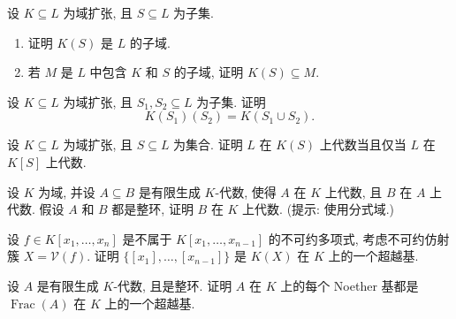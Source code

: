 \BookExerciseHeading
\begin{BookExercises}
  \item\label{ex:generated-field-minimality} 设 $K\subseteq L$ 为域扩张, 且 $S\subseteq L$ 为子集.
  \begin{enumerate}
    \item 证明 $K(S)$ 是 $L$ 的子域.
    \item 若 $M$ 是 $L$ 中包含 $K$ 和 $S$ 的子域, 证明 $K(S)\subseteq M$.
  \end{enumerate}
  \item\label{ex:generated-field-in-stages} 设 $K\subseteq L$ 为域扩张, 且 $S_{1},S_{2}\subseteq L$ 为子集. 证明
  \[
    K(S_{1})(S_{2})=K(S_{1}\cup S_{2}).
  \]
  \item\label{ex:algebraic-over-generated-field-iff-algebraic-over-algebra} 设 $K\subseteq L$ 为域扩张, 且 $S\subseteq L$ 为集合. 证明 $L$ 在 $K(S)$ 上代数当且仅当 $L$ 在 $K[S]$ 上代数.
  \item\label{ex:algebraic-transitivity-for-domains} 设 $K$ 为域, 并设 $A\subseteq B$ 是有限生成 $K$-代数, 使得 $A$ 在 $K$ 上代数, 且 $B$ 在 $A$ 上代数. 假设 $A$ 和 $B$ 都是整环, 证明 $B$ 在 $K$ 上代数. (提示: 使用分式域.)
  \item\label{ex:hypersurface-transcendence-basis} 设 $f\in K[x_{1},\ldots,x_{n}]$ 是不属于 $K[x_{1},\ldots,x_{n-1}]$ 的不可约多项式, 考虑不可约仿射簇 $X=\mathcal{V}(f)$. 证明 $\{[x_{1}],\ldots,[x_{n-1}]\}$ 是 $K(X)$ 在 $K$ 上的一个超越基.
  \item\label{ex:noether-basis-is-transcendence-basis-of-fraction-field} 设 $A$ 是有限生成 $K$-代数, 且是整环. 证明 $A$ 在 $K$ 上的每个 Noether 基都是 $\operatorname{Frac}(A)$ 在 $K$ 上的一个超越基.
\end{BookExercises}
